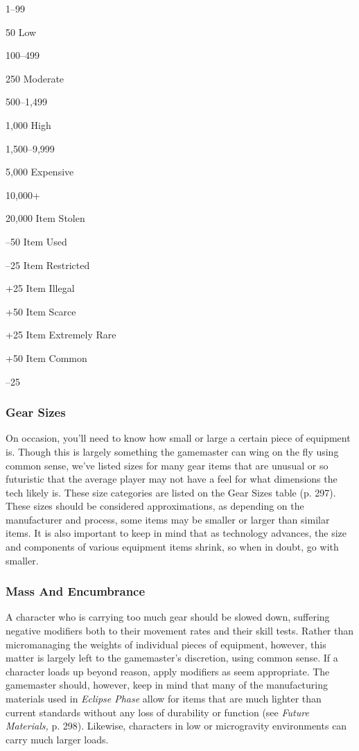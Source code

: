 1–99

50
Low

100–499

250
Moderate

500–1,499

1,000
High

1,500–9,999

5,000
Expensive

10,000+

20,000
Item Stolen

–50%
Item Used

–25%
Item Restricted

+25%
Item Illegal

+50%
Item Scarce

+25%
Item Extremely Rare

+50%
Item Common

–25%

\subsubsection{Gear Sizes}

On occasion, you'll need to know how small or large 
a certain piece of equipment is. Though this is largely 
something the gamemaster can wing on the fly using 
common sense, we've listed sizes for many gear items 
that are unusual or so futuristic that the average player 
may not have a feel for what dimensions the tech 
likely is. These size categories are listed on the Gear 
Sizes table (p. 297). These sizes should be considered 
approximations, as depending on the manufacturer 
and process, some items may be smaller or larger than 
similar items. It is also important to keep in mind that 
as technology advances, the size and components of 
various equipment items shrink, so when in doubt, go 
with smaller.

\subsubsection{Mass And Encumbrance}

A character who is carrying too much gear should 
be slowed down, suffering negative modifiers  both 
to their movement rates and their skill tests. Rather 
than micromanaging the weights of individual pieces 
of equipment, however, this matter is largely left to 
the gamemaster's discretion, using common sense. If a 
character loads up beyond reason, apply modifiers as 
seem appropriate. The gamemaster should, however, 
keep in mind that many of the manufacturing materials
used in \textit{Eclipse Phase} allow for items that are
much lighter than current standards without any loss 
of durability or function (see \textit{Future Materials,} p. 298). 
Likewise, characters in low or microgravity environments
can carry much larger loads.

